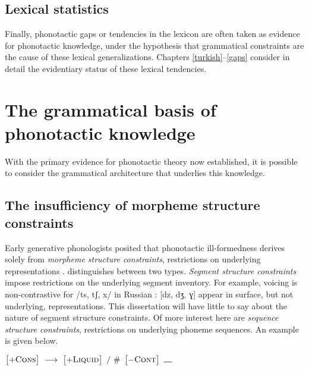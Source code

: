 \subsection{Lexical statistics}

Finally, phonotactic gaps or tendencies in the lexicon are often taken as evidence for phonotactic knowledge, under the hypothesis that grammatical constraints are the cause of these lexical generalizations.
Chapters \ref{turkish}--\ref{gaps} consider in detail the evidentiary status of these lexical tendencies.

\section{The grammatical basis of phonotactic knowledge}

With the primary evidence for phonotactic theory now established, it is possible to consider the grammatical architecture that underlies this knowledge.

\subsection{The insufficiency of morpheme structure constraints}

Early generative phonologists posited that phonotactic ill-formedness derives solely from \emph{morpheme structure constraints}, restrictions on underlying representations \citep{Chomsky1965,SPE,SPR,Halle1962}.
\citet{Stanley1967} distinguishes between two types.
\emph{Segment structure constraints} impose restrictions on the underlying segment inventory.
For example, voicing is non-contrastive for /ts, tʃ, x/ in Russian \cite[22]{SPR}: [dz, dʒ, ɣ] appear in surface, but not underlying, representations.
This dissertation will have little to say about the nature of segment structure constraints.
Of more interest here are \emph{sequence structure constraints}, restrictions on underlying phoneme sequences. 
An example is given below.

\begin{example}
$\begin{bmatrix} +\textsc{Cons} \end{bmatrix}~\goesto~\begin{bmatrix} +\textsc{Liquid} \end{bmatrix}~/~\#~\begin{bmatrix} -\textsc{Cont} \end{bmatrix}~\gap$
\end{example}

